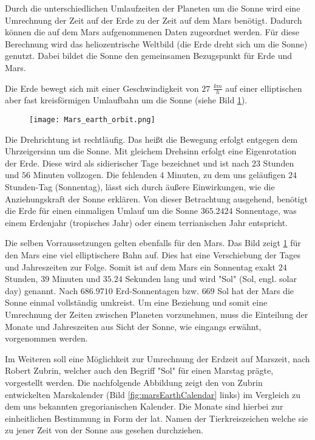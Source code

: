 
Durch die unterschiedlichen Umlaufzeiten der Planeten um die Sonne wird eine
Umrechnung der Zeit auf der Erde zu der Zeit auf dem Mars ben{\"o}tigt.
Dadurch k{\"o}nnen die auf dem Mars aufgenommenen Daten zugeordnet werden.
F{\"u}r diese Berechnung wird das heliozentrische Weltbild (die Erde dreht sich
um die Sonne) genutzt.
Dabei bildet die Sonne den gemeinsamen Bezugspunkt f{\"u}r Erde und Mars.

Die Erde bewegt sich mit einer Geschwindigkeit von $27$ $\frac{km}{h}$ auf einer
elliptischen aber fast kreisf{\"o}rmigen Umlaufbahn um die Sonne (siehe Bild
\ref{fig:marsEarthOrbit}).

\begin{figure}[H]
	\centering
	\texttt{[image: Mars\_earth\_orbit.png]}
	\label{fig:marsEarthOrbit}
\end{figure}

Die Drehrichtung ist rechtl{\"a}ufig. Das heißt die Bewegung erfolgt entgegen dem
Uhrzeigersinn um die Sonne. Mit gleichem Drehsinn erfolgt eine Eigenrotation
der Erde. Diese wird als sidierischer Tage bezeichnet und ist nach $23$ Stunden
und $56$ Minuten vollzogen. Die fehlenden $4$ Minuten, zu dem uns gel{\"a}ufigen
$24$ Stunden-Tag (Sonnentag), l{\"a}sst sich durch {\"a}ußere Einwirkungen, wie die
Anziehungskraft der Sonne erkl{\"a}ren. Von dieser Betrachtung ausgehend, ben{\"o}tigt
die Erde f{\"u}r einen einmaligen Umlauf um die Sonne $365.2424$ Sonnentage, was
einem Erdenjahr (tropisches Jahr) oder einem terrianischen Jahr entspricht. 

Die selben Vorraussetzungen gelten ebenfalls f{\"u}r den Mars. Das Bild zeigt
\ref{fig:marsEarthOrbit} f{\"u}r den Mars eine viel elliptischere Bahn auf. Dies hat
eine Verschiebung der Tages und Jahreszeiten zur Folge. Somit ist auf dem Mars
ein Sonnentag exakt $24$ Stunden, $39$ Minuten und $35.24$ Sekunden lang und
wird "Sol" (Sol, engl. solar day) genannt. Nach $686.9710$ Erd-Sonnentagen bzw.
$669$ Sol hat der Mars die Sonne einmal vollst{\"a}ndig umkreist. Um eine Beziehung
und somit eine Umrechnung der Zeiten zwischen Planeten vorzunehmen, muss die
Einteilung der Monate und Jahreszeiten aus Sicht der Sonne, wie eingangs
erw{\"a}hnt, vorgenommen werden.

Im Weiteren soll eine M{\"o}glichkeit zur Umrechnung der Erdzeit auf Marszeit, nach
Robert Zubrin,  welcher auch den Begriff "Sol" f{\"u}r einen
Marstag pr{\"a}gte, vorgestellt werden. Die nachfolgende Abbildung zeigt den von Zubrin entwickelten
Marskalender (Bild \ref{fig:marsEarthCalendar} links) im Vergleich zu dem uns
bekannten gregorianischen Kalender. Die Monate sind hierbei zur einheitlichen
Bestimmung in Form der lat. Namen der Tierkreiszeichen welche sie zu jener Zeit
von der Sonne aus gesehen durchziehen.

